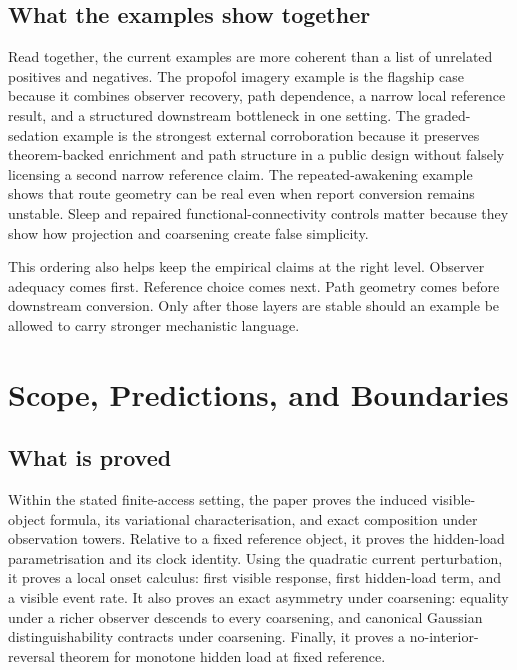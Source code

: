 \documentclass[11pt,a4paper]{article}
\numberwithin{equation}{section}
\theoremstyle{thmcompact}
\theoremstyle{remark}
\begin{document}
\subsection{What the examples show together}

Read together, the current examples are more coherent than a list of unrelated positives and negatives. The propofol imagery example is the flagship case because it combines observer recovery, path dependence, a narrow local reference result, and a structured downstream bottleneck in one setting. The graded-sedation example is the strongest external corroboration because it preserves theorem-backed enrichment and path structure in a public design without falsely licensing a second narrow reference claim. The repeated-awakening example shows that route geometry can be real even when report conversion remains unstable. Sleep and repaired functional-connectivity controls matter because they show how projection and coarsening create false simplicity.

This ordering also helps keep the empirical claims at the right level. Observer adequacy comes first. Reference choice comes next. Path geometry comes before downstream conversion. Only after those layers are stable should an example be allowed to carry stronger mechanistic language.

\section{Scope, Predictions, and Boundaries}
\label{sec:scope-predictions}

\subsection{What is proved}

Within the stated finite-access setting, the paper proves the induced visible-object formula, its variational characterisation, and exact composition under observation towers. Relative to a fixed reference object, it proves the hidden-load parametrisation and its clock identity. Using the quadratic current perturbation, it proves a local onset calculus: first visible response, first hidden-load term, and a visible event rate. It also proves an exact asymmetry under coarsening: equality under a richer observer descends to every coarsening, and canonical Gaussian distinguishability contracts under coarsening. Finally, it proves a no-interior-reversal theorem for monotone hidden load at fixed reference.
\end{document}
